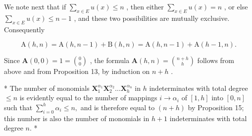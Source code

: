 We note next that if \(\sum_{x\in E}u(x)\leqslant n\) , then either \(\sum_{x\in E}u(x) = n\) , or else \(\sum_{x\in E}u(x)\leqslant n - 1\) , and these two possibilities are mutually exclusive. Consequently

\[
\mathrm{A} (h, n) = \mathrm{A} (h, n - 1) + \mathrm{B} (h, n) = \mathrm{A} (h, n - 1) + \mathrm{A} (h - 1, n).
\]

Since \(\mathbf{A}(0,0) = 1 = \binom{0}{0}\) , the formula \(\mathbf{A}(h,n) = \binom{n + h}{h}\) follows from above and from Proposition 13, by induction on \(n + h\) .

* The number of monomials \(\mathbf{X}_1^{\alpha_1}\mathbf{X}_2^{\alpha_2}\ldots \mathbf{X}_h^{\alpha_n}\) in \(h\) indeterminates with total degree \(\leqslant n\) is evidently equal to the number of mappings \(i\to \alpha_{i}\) of \([1,h]\) into \([0,n]\) such that \(\sum_{i = 0}^{h}\alpha_{i}\leqslant n,\) and is therefore equal to \((n + h)\) by Proposition 15; this number is also the number of monomials in \(h + 1\) indeterminates with total degree \(n.\) *

